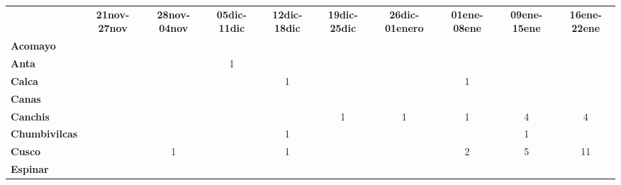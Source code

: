 \begin{tabular}{lccccccccc}
	&\textbf{21nov-27nov} 	  					&\textbf{28nov-04nov} 	
	&\textbf{05dic-11dic}						&\textbf{12dic-18dic}			&\textbf{19dic-25dic}
	&\textbf{26dic-01enero}						&\textbf{01ene-08ene}			&\textbf{09ene-15ene}
	&\textbf{16ene-22ene}\\
	\textbf{Acomayo}                        	
	&\cellcolor[HTML]{FCC46C}                   &\cellcolor[HTML]{FCC46C}  			        &\cellcolor[HTML]{FCC46C}          			&\cellcolor[HTML]{FCC46C} 					&\cellcolor[HTML]{FCC46C} 	    			&\cellcolor[HTML]{FCC46C}				    &\cellcolor[HTML]{FCC46C}
	&\cellcolor[HTML]{FCC46C}				&\cellcolor[HTML]{FCC46C}\\
	\textbf{Anta}                                                          		
	&\cellcolor[HTML]{FCC46C}					&\cellcolor[HTML]{FCC46C} 					
	&1											&\cellcolor[HTML]{FCC46C}					
	&\cellcolor[HTML]{FCC46C}					&\cellcolor[HTML]{FCC46C} 
	&\cellcolor[HTML]{FCC46C}					&\cellcolor[HTML]{FCC46C}
	&\cellcolor[HTML]{FCC46C}\\
	\textbf{Calca}      				       
	&\cellcolor[HTML]{FCC46C}                   &\cellcolor[HTML]{FCC46C}  		            &\cellcolor[HTML]{FCC46C} 					&1 								            
	&\cellcolor[HTML]{FCC46C}					&\cellcolor[HTML]{FCC46C} 
	&1											&\cellcolor[HTML]{FCC46C}	&\cellcolor[HTML]{FCC46C}\\                										
	\textbf{Canas}                              
	 &\cellcolor[HTML]{FCC46C} 					&\cellcolor[HTML]{FCC46C}       			&\cellcolor[HTML]{FCC46C} 
	&\cellcolor[HTML]{FCC46C} 					&\cellcolor[HTML]{FCC46C} 		&\cellcolor[HTML]{FCC46C}					&\cellcolor[HTML]{FCC46C} 		
	&\cellcolor[HTML]{FCC46C}					&\cellcolor[HTML]{FCC46C}\\
	\textbf{Canchis}                            
	&\cellcolor[HTML]{FCC46C}   				&\cellcolor[HTML]{FCC46C} 							&\cellcolor[HTML]{FCC46C}					&\cellcolor[HTML]{FCC46C} 		
	&1											&1
	&1											&4
	&4\\
	\textbf{Chumbivilcas}                      
	&\cellcolor[HTML]{FCC46C}   			    &\cellcolor[HTML]{FCC46C}
	&\cellcolor[HTML]{FCC46C}					&1			
	&\cellcolor[HTML]{FCC46C}					&\cellcolor[HTML]{FCC46C}
	&\cellcolor[HTML]{FCC46C}					&1
	&\cellcolor[HTML]{FCC46C} \\
	\textbf{Cusco}                             
	&\cellcolor[HTML]{FCC46C} 		 			&1											
	&\cellcolor[HTML]{FCC46C}					&1											
	&\cellcolor[HTML]{FCC46C}					&\cellcolor[HTML]{FCC46C}
	&2											&5
	&11\\
	\textbf{Espinar}       					                 						   

\end{tabular}
